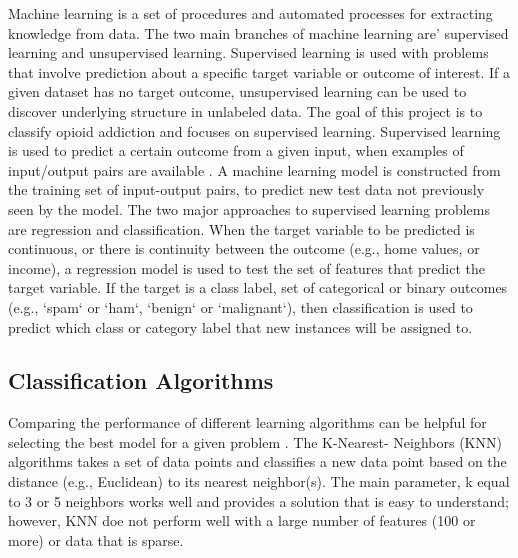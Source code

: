 \documentclass[sigconf]{acmart}
\begin{document}
Machine learning is a set of procedures and automated processes for extracting 
knowledge from data. The two main branches of machine learning are' supervised 
learning and unsupervised learning. Supervised learning is used with problems 
that involve prediction about a specific target variable or outcome of interest. 
If a given dataset has no target outcome, unsupervised learning can be used to 
discover underlying structure in unlabeled data. The goal of this project is 
to classify opioid addiction and focuses on supervised learning. Supervised 
learning is used to predict a certain outcome from a given input, when examples 
of input/output pairs are available \cite{muller17}. A machine learning model 
is constructed from the training set of input-output pairs, to predict new test 
data not previously seen by the model. The two major approaches to supervised 
learning problems are regression and classification. When the target variable 
to be predicted is continuous, or there is continuity between the outcome 
(e.g., home values, or income), a regression model is used to test the set of 
features that predict the target variable. If the target is a class label, set 
of categorical or binary outcomes (e.g., `spam` or `ham`, `benign` or 
`malignant`), then classification is used to predict which class or category 
label that new instances will be assigned to.

\subsection{Classification Algorithms} 
Comparing the performance of different learning algorithms can be helpful for 
selecting the best model for a given problem \cite{raschka17}. The K-Nearest-
Neighbors (KNN) algorithms takes a set of data points and classifies a new data 
point based on the distance (e.g., Euclidean) to its nearest neighbor(s). 
The main parameter, k equal to 3 or 5 neighbors works well and provides a 
solution that is easy to understand; however, KNN doe not perform well with 
a large number of features (100 or more) or data that is sparse. 
\end{document}
